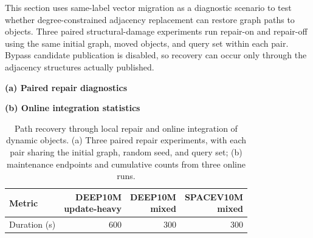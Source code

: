 \documentclass[sigconf,pbalance]{acmart}
\begin{document}
This section uses same-label vector migration as a diagnostic scenario to test whether degree-constrained adjacency replacement can restore graph paths to objects. Three paired structural-damage experiments run repair-on and repair-off using the same initial graph, moved objects, and query set within each pair. Bypass candidate publication is disabled, so recovery can occur only through the adjacency structures actually published.

\begin{table}[t]
  \centering
\caption{Path recovery through local repair and online integration of dynamic objects. (a) Three paired repair experiments, with each pair sharing the initial graph, random seed, and query set; (b) maintenance endpoints and cumulative counts from three online runs.}\label{tab:eval-repair}
  \scriptsize\setlength{\tabcolsep}{3pt}
\textbf{(a) Paired repair diagnostics}\par\smallskip
  \par\medskip
\textbf{(b) Online integration statistics}\par\smallskip
  \begin{tabular*}{\columnwidth}{@{\extracolsep{\fill}}lrrr@{}}
    \toprule
Metric & \shortstack{DEEP10M\\update-heavy} & \shortstack{DEEP10M\\mixed} & \shortstack{SPACEV10M\\mixed} \\
    \midrule
Duration (s) & 600 & 300 & 300 \\

\end{tabular*}
\end{table}
\end{document}
